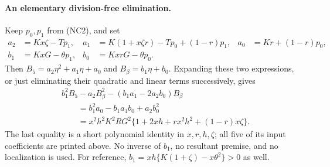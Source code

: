 \paragraph{An elementary division-free elimination.}
Keep $p_0,p_1$ from (NC2), and set
\begin{align*}
 a_2&=Kx\zeta-Tp_1,&
 a_1&=K(1+x\zeta r)-Tp_0+(1-r)p_1,&
 a_0&=Kr+(1-r)p_0,\\
 b_1&=KxG-\theta p_1,&
 b_0&=KxrG-\theta p_0.
\end{align*}
Then $B_5=a_2\eta^2+a_1\eta+a_0$ and
$B_\beta=b_1\eta+b_0$. Expanding these two expressions, or just
eliminating their quadratic and linear terms successively, gives
\begin{align*}
 &b_1^2B_5-a_2B_\beta^2-(b_1a_1-2a_2b_0)B_\beta\\
 &\qquad=b_1^2a_0-b_1a_1b_0+a_2b_0^2\\
 &\qquad=x^2h^2K^2RG^2
       \{1+2xh+rx^2h^2+(1-r)x\zeta\}.
 \tag{NC7}
\end{align*}
The last equality is a short polynomial identity in $x,r,h,\zeta$;
all five of its input coefficients are printed above. No inverse of
$b_1$, no resultant premise, and no localization is used. For reference,
$b_1=xh\{K(1+\zeta)-x\theta^2\}>0$ as well.

